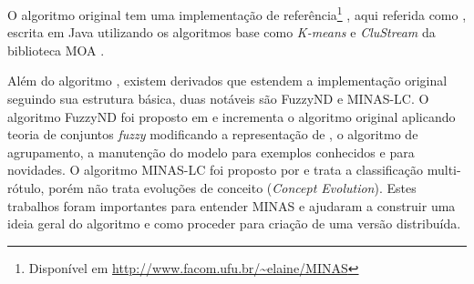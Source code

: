 

O algoritmo \minas original \cite{Faria2016minas} tem uma implementação
de referência\footnote{Disponível em \url{http://www.facom.ufu.br/~elaine/MINAS}}
\cite{Faria2013source}, aqui referida como , escrita em Java utilizando
os algoritmos base como \emph{K-means} e \emph{CluStream} da biblioteca MOA
\cite{MOA}.

Além do algoritmo \minas, existem derivados que estendem a implementação
original seguindo sua estrutura básica, duas notáveis são FuzzyND e MINAS-LC.
O algoritmo FuzzyND foi proposto em  e
incrementa o algoritmo original aplicando teoria de conjuntos \emph{fuzzy}
modificando a representação de \cluster, o algoritmo de agrupamento, a manutenção
do modelo para exemplos conhecidos e para novidades.
O algoritmo MINAS-LC foi proposto por  e trata a
classificação multi-rótulo, porém não trata evoluções de conceito (\emph{Concept
Evolution}).
Estes trabalhos foram importantes para entender MINAS e ajudaram a construir uma
ideia geral do algoritmo e como proceder para criação de uma versão distribuída.




